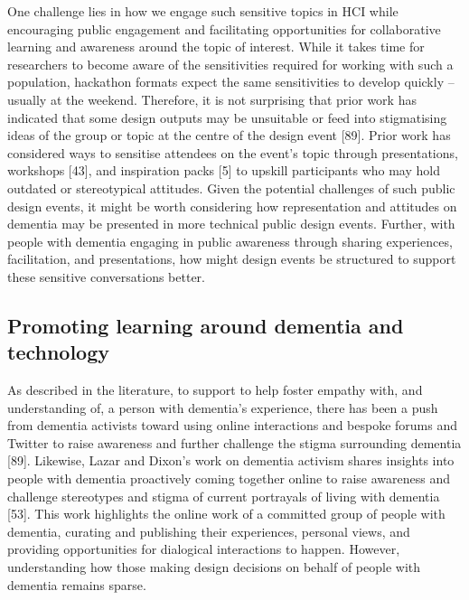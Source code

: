 One challenge lies in how we engage such sensitive topics in HCI while encouraging public engagement and facilitating opportunities for collaborative learning and awareness around the topic of interest. While it takes time for researchers to become aware of the sensitivities required for working with such a population, hackathon formats expect the same sensitivities to develop quickly – usually at the weekend. Therefore, it is not surprising that prior work has indicated that some design outputs may be unsuitable or feed into stigmatising ideas of the group or topic at the centre of the design event [89]. Prior work has considered ways to sensitise attendees on the event's topic through presentations, workshops [43], and inspiration packs [5] to upskill participants who may hold outdated or stereotypical attitudes. Given the potential challenges of such public design events, it might be worth considering how representation and attitudes on dementia may be presented in more technical public design events. Further, with people with dementia engaging in public awareness through sharing experiences, facilitation, and presentations, how might design events be structured to support these sensitive conversations better.


\subsection{Promoting learning around dementia and technology}
\label{BL:gap:Learning}
As described in the literature, to support to help foster empathy with, and understanding of, a person with dementia's experience, there has been a push from dementia activists toward using online interactions and bespoke forums and Twitter to raise awareness and further challenge the stigma surrounding dementia [89]. Likewise, Lazar and Dixon's work on dementia activism shares insights into people with dementia proactively coming together online to raise awareness and challenge stereotypes and stigma of current portrayals of living with dementia [53]. This work highlights the online work of a committed group of people with dementia, curating and publishing their experiences, personal views, and providing opportunities for dialogical interactions to happen. However, understanding how those making design decisions on behalf of people with dementia remains sparse. 

